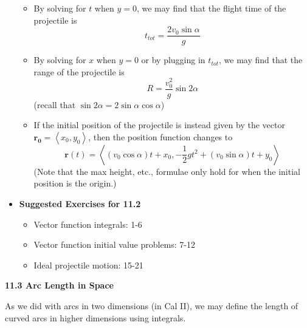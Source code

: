 \documentclass[12pt]{article}
\theoremstyle{plain}
\theoremstyle{definition}
\theoremstyle{remark}
\newcommand{\vect}[1]{\mathbf{#1}}
\begin{document}
\begin{itemize}
\begin{itemize}
			\item By solving for $t$ when $y=0$, we may find that the flight time of the projectile is \[t_{tot} = \frac{2v_0\sin\alpha}{g}\]
			\item By solving for $x$ when $y=0$ or by plugging in $t_{tot}$, we may find that the range of the projectile is \[R = \frac{v_0^2}{g}\sin2\alpha\] (recall that $\sin2\alpha = 2\sin\alpha\cos\alpha$)
			\item If the initial position of the projectile is instead given by the vector $\vect{r_0}=\left<x_0,y_0\right>$, then the position function changes to \[\vect{r}(t)=\left<(v_0\cos\alpha)t+x_0,-\frac{1}{2}gt^2+(v_0\sin\alpha)t+y_0\right>\] (Note that the max height, etc., formulae only hold for when the initial position is the origin.)
			\end{itemize}
		\item \textbf{Suggested Exercises for 11.2}
			\begin{itemize}
			\item Vector function integrals: 1-6
			\item Vector function initial value problems: 7-12
			\item Ideal projectile motion: 15-21
			\end{itemize}
		\end{itemize}
	
	\newpage
	
	\centerline{\bf 11.3 Arc Length in Space}
	
	As we did with arcs in two dimensions (in Cal II), we may define the length of curved arcs in higher dimensions using integrals.
	
\end{document}
